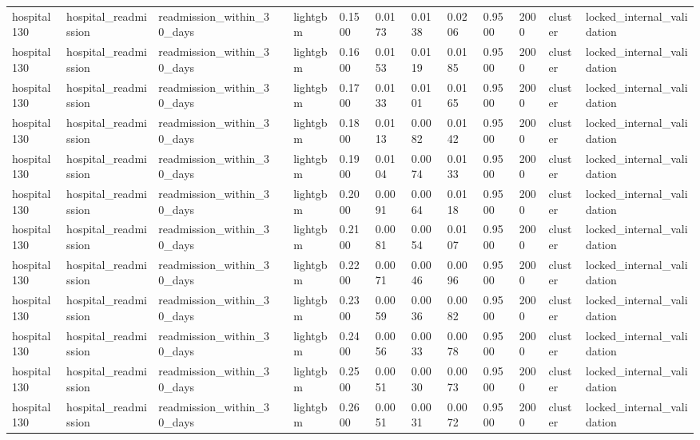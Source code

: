 \begin{tabular}{lllllllllllll}
hospital130 & hospital\_readmission & readmission\_within\_30\_days &  & lightgbm & 0.1500 & 0.0173 & 0.0138 & 0.0206 & 0.9500 & 2000 & cluster & locked\_internal\_validation \\
hospital130 & hospital\_readmission & readmission\_within\_30\_days &  & lightgbm & 0.1600 & 0.0153 & 0.0119 & 0.0185 & 0.9500 & 2000 & cluster & locked\_internal\_validation \\
hospital130 & hospital\_readmission & readmission\_within\_30\_days &  & lightgbm & 0.1700 & 0.0133 & 0.0101 & 0.0165 & 0.9500 & 2000 & cluster & locked\_internal\_validation \\
hospital130 & hospital\_readmission & readmission\_within\_30\_days &  & lightgbm & 0.1800 & 0.0113 & 0.0082 & 0.0142 & 0.9500 & 2000 & cluster & locked\_internal\_validation \\
hospital130 & hospital\_readmission & readmission\_within\_30\_days &  & lightgbm & 0.1900 & 0.0104 & 0.0074 & 0.0133 & 0.9500 & 2000 & cluster & locked\_internal\_validation \\
hospital130 & hospital\_readmission & readmission\_within\_30\_days &  & lightgbm & 0.2000 & 0.0091 & 0.0064 & 0.0118 & 0.9500 & 2000 & cluster & locked\_internal\_validation \\
hospital130 & hospital\_readmission & readmission\_within\_30\_days &  & lightgbm & 0.2100 & 0.0081 & 0.0054 & 0.0107 & 0.9500 & 2000 & cluster & locked\_internal\_validation \\
hospital130 & hospital\_readmission & readmission\_within\_30\_days &  & lightgbm & 0.2200 & 0.0071 & 0.0046 & 0.0096 & 0.9500 & 2000 & cluster & locked\_internal\_validation \\
hospital130 & hospital\_readmission & readmission\_within\_30\_days &  & lightgbm & 0.2300 & 0.0059 & 0.0036 & 0.0082 & 0.9500 & 2000 & cluster & locked\_internal\_validation \\
hospital130 & hospital\_readmission & readmission\_within\_30\_days &  & lightgbm & 0.2400 & 0.0056 & 0.0033 & 0.0078 & 0.9500 & 2000 & cluster & locked\_internal\_validation \\
hospital130 & hospital\_readmission & readmission\_within\_30\_days &  & lightgbm & 0.2500 & 0.0051 & 0.0030 & 0.0073 & 0.9500 & 2000 & cluster & locked\_internal\_validation \\
hospital130 & hospital\_readmission & readmission\_within\_30\_days &  & lightgbm & 0.2600 & 0.0051 & 0.0031 & 0.0072 & 0.9500 & 2000 & cluster & locked\_internal\_validation \\

\end{tabular}
